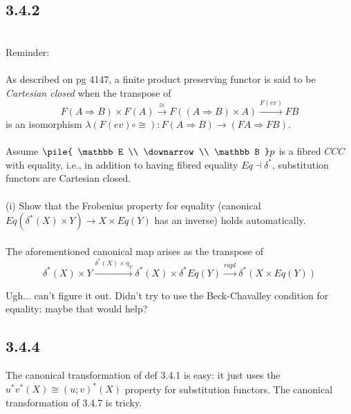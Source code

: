 \documentclass{article}
\newcommand{\vrt}[2]{
\pile{
#1 \\
\downarrow \\
#2
}
}
\begin{document}
\subsection*{3.4.2}~\\
Reminder:\\~\\
As described on pg 4147, a finite product preserving functor is said to be \emph{Cartesian closed} when
the transpose of
$$ F(A \Rightarrow B) \times F(A) \overset{\cong}{\longrightarrow} F((A \Rightarrow B) \times A) \overset{F(ev)}{\longrightarrow} FB$$
is an isomorphism $\lambda(F(ev) \circ \cong) : F(A \Rightarrow B) \to (FA \Rightarrow FB)$.\\~\\
Assume $\vrt{\mathbb E}{\mathbb B}p$ is a fibred $CCC$ with equality, i.e., in addition to having fibred 
equality $Eq \dashv \delta^*$, substitution functors are Cartesian closed.\\~\\
(i) Show that the Frobenius property for equality (canonical $Eq(\delta^*(X) \times Y) \longrightarrow X \times Eq(Y)$ has an inverse) holds automatically.\\~\\
The aforementioned canonical map arises as the transpose of 
$$\delta^*(X) \times Y \overset{\delta^*(X) \times \eta_Y}{\longrightarrow} \delta^*(X) \times \delta^*Eq(Y) 
  \overset{rapl}{\longrightarrow} \delta^*(X \times Eq(Y)) $$

Ugh... can't figure it out. Didn't try to use the Beck-Chavalley condition for equality: maybe that would help?

\subsection*{3.4.4}

The canonical transformation of def 3.4.1 is easy: it just uses the $u^*v^*(X) \cong (u;v)^*(X)$ property for 
substitution functors. The canonical transformation of 3.4.7 is tricky.
\end{document}
